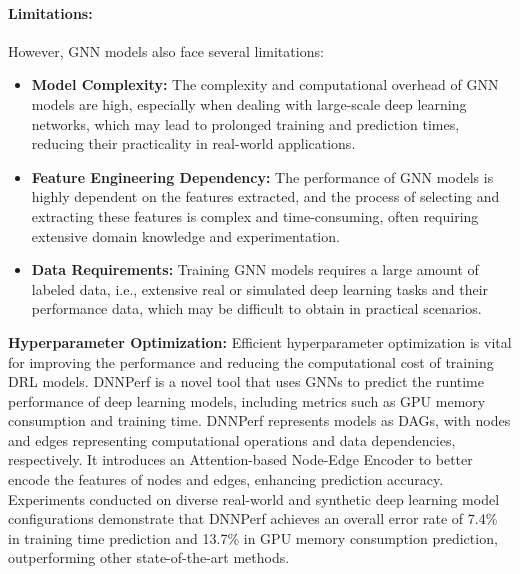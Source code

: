 \documentclass[10pt,journal,compsoc]{IEEEtran}
\begin{document}
\paragraph{Limitations:} However, GNN models also face several limitations:
\begin{itemize}
    \item \textbf{Model Complexity:} The complexity and computational overhead of GNN models are high, especially when dealing with large-scale deep learning networks, which may lead to prolonged training and prediction times, reducing their practicality in real-world applications.
    \item \textbf{Feature Engineering Dependency:} The performance of GNN models is highly dependent on the features extracted, and the process of selecting and extracting these features is complex and time-consuming, often requiring extensive domain knowledge and experimentation.
    \item \textbf{Data Requirements:} Training GNN models requires a large amount of labeled data, i.e., extensive real or simulated deep learning tasks and their performance data, which may be difficult to obtain in practical scenarios.
\end{itemize}

\noindent\textbf{Hyperparameter Optimization:} Efficient hyperparameter optimization is vital for improving the performance and reducing the computational cost of training DRL models.
%
DNNPerf \cite{dnnperf} is a novel tool that uses GNNs to predict the runtime performance of deep learning models, including metrics such as GPU memory consumption and training time.
%
DNNPerf represents models as DAGs, with nodes and edges representing computational operations and data dependencies, respectively. 
%
It introduces an Attention-based Node-Edge Encoder to better encode the features of nodes and edges, enhancing prediction accuracy.
%
Experiments conducted on diverse real-world and synthetic deep learning model configurations demonstrate that DNNPerf achieves an overall error rate of 7.4\% in training time prediction and 13.7\% in GPU memory consumption prediction, outperforming other state-of-the-art methods.
\end{document}
